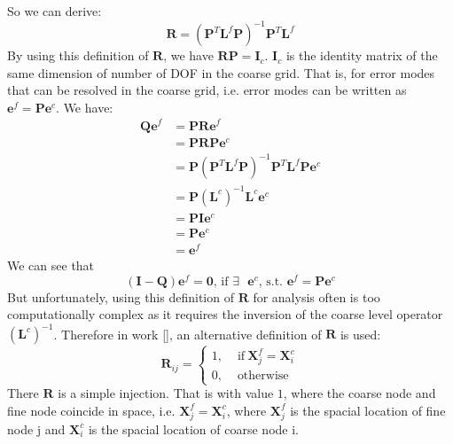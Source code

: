 So we can derive:
\begin{equation}
 \mathbf{R} = (\mathbf{P}^T\mathbf{L}^f\mathbf{P})^{-1}\mathbf{P}^T\mathbf{L}^f
\end{equation}
By using this definition of $\mathbf{R}$, we have $\mathbf{R}\mathbf{P} = \mathbf{I}_c$. $\mathbf{I}_c$ is the identity matrix of the same dimension of number of DOF in the coarse grid. That is, for error modes that can be resolved in the coarse grid, i.e. error modes can be written as $\mathbf{e}^f = \mathbf{P}\mathbf{e}^c$. We have:
\begin{align*}
\mathbf{Q}\mathbf{e}^f &= \mathbf{P}\mathbf{R}\mathbf{e}^f\\
&= \mathbf{P}\mathbf{R}\mathbf{P}\mathbf{e}^c\\
&= \mathbf{P}(\mathbf{P}^T\mathbf{L}^f\mathbf{P})^{-1}\mathbf{P}^T\mathbf{L}^f\mathbf{P}\mathbf{e}^c\\
&= \mathbf{P}(\mathbf{L}^c)^{-1}\mathbf{L}^c\mathbf{e}^c\\
&= \mathbf{P}\mathbf{I}\mathbf{e}^c\\
&= \mathbf{P}\mathbf{e}^c \\
&= \mathbf{e}^f
\end{align*}
We can see that 
\begin{equation}\label{equ:projection_Q}
(\mathbf{I} - \mathbf{Q})\mathbf{e}^f = \mathbf{0}\text{, if $\exists$ $\mathbf{e}^c$, s.t. }\mathbf{e}^f = \mathbf{P}\mathbf{e}^c
\end{equation}
But unfortunately, using this definition of $\mathbf{R}$ for analysis often is too computationally complex as it requires the inversion of the coarse level operator $(\mathbf{L}^c)^{-1}$. Therefore in work [\cite{brezina2001algebraic}], an alternative definition of $\mathbf{R}$ is used:
\begin{equation}
\mathbf{R}_{ij} = \left\{  
\begin{aligned}
    1, & \text{ if}\ \mathbf{X}^f_j = \mathbf{X}^c_i\\
    0, & \text{ otherwise}
  \end{aligned}\right.
\end{equation}
There $\mathbf{R}$ is a simple injection. That is with value $1$, where the coarse node and fine node coincide in space, i.e. $\mathbf{X}^f_j = \mathbf{X}^c_i$, where $\mathbf{X}^f_j$ is the spacial location of fine node j and $\mathbf{X}^c_i$ is the spacial location of coarse node i.

